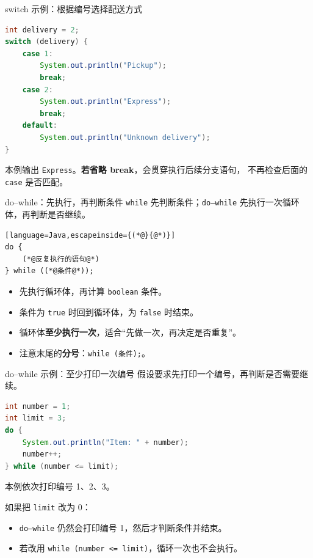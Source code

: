 \documentclass[aspectratio=169]{beamer}
\begin{document}
\begin{frame}[fragile]{switch 示例：根据编号选择配送方式}
  \begin{lstlisting}[language=Java]
int delivery = 2;
switch (delivery) {
    case 1:
        System.out.println("Pickup");
        break;
    case 2:
        System.out.println("Express");
        break;
    default:
        System.out.println("Unknown delivery");
}
  \end{lstlisting}
  本例输出 \texttt{Express}。\textbf{若省略 break}，会贯穿执行后续分支语句，
  不再检查后面的 \texttt{case} 是否匹配。
\end{frame}

\begin{frame}[fragile]{do--while：先执行，再判断条件}
  \texttt{while} 先判断条件；\texttt{do--while} 先执行一次循环体，再判断是否继续。
  \par\medskip
  \begin{lstlisting}[language=Java,escapeinside={(*@}{@*)}]
do {
    (*@反复执行的语句@*)
} while ((*@条件@*));
  \end{lstlisting}
  \begin{itemize}
    \item 先执行循环体，再计算 \texttt{boolean} 条件。
    \item 条件为 \texttt{true} 时回到循环体，为 \texttt{false} 时结束。
    \item 循环体\textbf{至少执行一次}，适合“先做一次，再决定是否重复”。
    \item 注意末尾的\textbf{分号}：\texttt{while (条件);}。
  \end{itemize}
\end{frame}

\begin{frame}[fragile]{do--while 示例：至少打印一次编号}
  假设要求先打印一个编号，再判断是否需要继续。
  \begin{lstlisting}[language=Java]
int number = 1;
int limit = 3;
do {
    System.out.println("Item: " + number);
    number++;
} while (number <= limit);
  \end{lstlisting}
  本例依次打印编号 1、2、3。
  \par\bigskip
  如果把 \texttt{limit} 改为 0：
  \begin{itemize}
    \item \texttt{do--while} 仍然会打印编号 1，然后才判断条件并结束。
    \item 若改用 \texttt{while (number <= limit)}，循环一次也不会执行。
  \end{itemize}
\end{frame}
\end{document}
